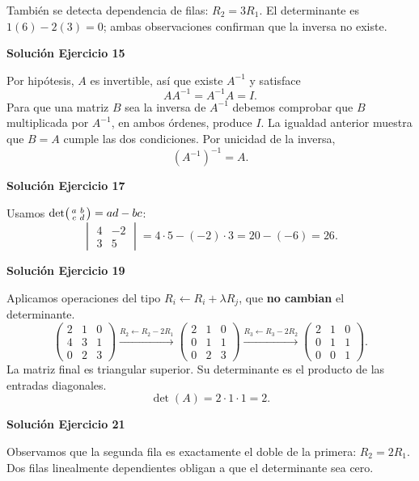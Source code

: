 También se detecta dependencia de filas: $R_2=3R_1$. El determinante es $1(6)-2(3)=0$; ambas observaciones confirman que la inversa no existe.


\par\bigskip\noindent\textbf{Solución Ejercicio 15}\par\nobreak
Por hipótesis, $A$ es invertible, así que existe $A^{-1}$ y satisface
\[
AA^{-1}=A^{-1}A=I.
\]
Para que una matriz $B$ sea la inversa de $A^{-1}$ debemos comprobar que $B$ multiplicada por $A^{-1}$, en ambos órdenes, produce $I$. La igualdad anterior muestra que $B=A$ cumple las dos condiciones. Por unicidad de la inversa,
\[
\boxed{(A^{-1})^{-1}=A}.
\]

\par\bigskip\noindent\textbf{Solución Ejercicio 17}\par\nobreak
Usamos $\det\begin{psmallmatrix}a&b\\c&d\end{psmallmatrix}=ad-bc$:
\[
\begin{vmatrix}4&-2\\3&5\end{vmatrix}=4\cdot 5-(-2)\cdot 3=20-(-6)=26.
\]

\par\bigskip\noindent\textbf{Solución Ejercicio 19}\par\nobreak
Aplicamos operaciones del tipo $R_i\leftarrow R_i+\lambda R_j$, que \textbf{no cambian} el determinante.
\[
\begin{pmatrix}2&1&0\\4&3&1\\0&2&3\end{pmatrix}\xrightarrow{R_2\leftarrow R_2-2R_1}\begin{pmatrix}2&1&0\\0&1&1\\0&2&3\end{pmatrix}\xrightarrow{R_3\leftarrow R_3-2R_2}\begin{pmatrix}2&1&0\\0&1&1\\0&0&1\end{pmatrix}.
\]
La matriz final es triangular superior. Su determinante es el producto de las entradas diagonales. \[
\boxed{\det(A)=2\cdot1\cdot1=2}.
\]

\par\bigskip\noindent\textbf{Solución Ejercicio 21}\par\nobreak
Observamos que la segunda fila es exactamente el doble de la primera: $R_2=2R_1$. Dos filas linealmente dependientes obligan a que el determinante sea cero.

